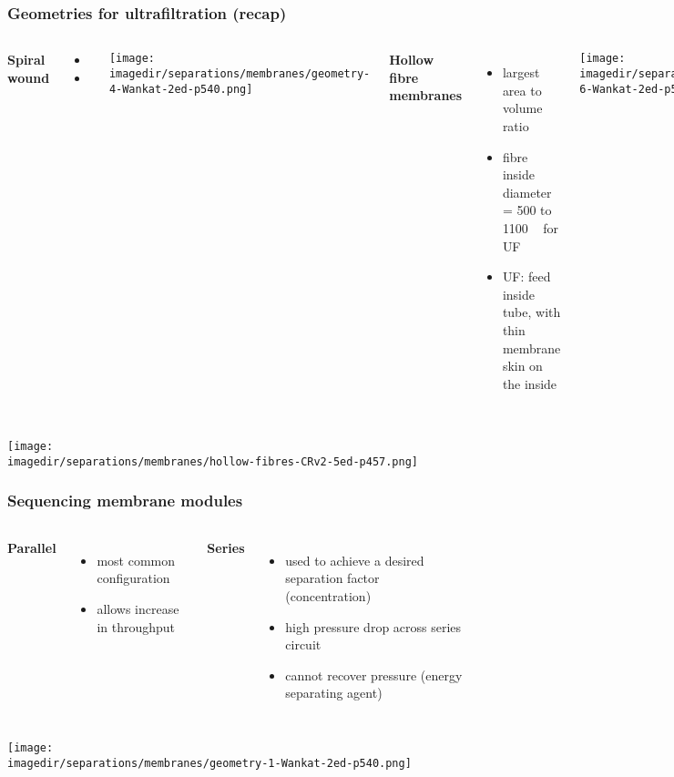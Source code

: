 \begin{frame}\frametitle{Geometries for ultrafiltration (recap)}
	\begin{columns}[t]
			\textbf{Spiral wound}
			
				\begin{itemize}
					\item	\iftoggle{instructor}{high surface area per unit volume}{}
					\item	\iftoggle{instructor}{high turbulence, reducing mass transfer resistance}{}
				\end{itemize} 
			\vfill
			\begin{center}
				\texttt{[image: \\imagedir/separations/membranes/geometry-4-Wankat-2ed-p540.png]}
			\end{center}
			\textbf{Hollow fibre membranes}
			\begin{itemize}
				\item	largest area to volume ratio
				\item	fibre inside diameter = 500 to 1100 \micron~ for UF
				\item	UF: feed inside tube, with thin membrane skin on the inside 
			\end{itemize}
			\begin{center}
				\texttt{[image: \\imagedir/separations/membranes/geometry-6-Wankat-2ed-p540.png]}
			\end{center}
	\end{columns}	
\end{frame}

\begin{frame}\frametitle{}
	\begin{center}
		\texttt{[image: \\imagedir/separations/membranes/hollow-fibres-CRv2-5ed-p457.png]}
	\end{center}
\end{frame}



\begin{frame}\frametitle{Sequencing membrane modules}
	\begin{columns}[t]
			\textbf{Parallel}
			\begin{itemize}
				\item	most common configuration
				\item	allows increase in throughput
			\end{itemize}
			\textbf{Series}
			\begin{itemize}
				\item	used to achieve a desired separation factor (concentration)
				\item	high pressure drop across series circuit
				\item	cannot recover pressure (energy separating agent)
			\end{itemize}			
	\end{columns}
	\begin{center}
		\texttt{[image: \\imagedir/separations/membranes/geometry-1-Wankat-2ed-p540.png]}
	\end{center}
\end{frame}


